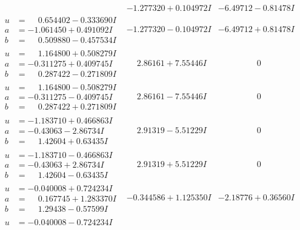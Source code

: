 \documentclass[1p]{elsarticle_modified}
\theoremstyle{definition}
\begin{document}
$$\begin{array}{c|c|c}
 & -1.277320 + 0.104972 I & -6.49712 - 0.81478 I \\ \hline\begin{aligned}
u &= \phantom{-}0.654402 - 0.333690 I \\
a &= -1.061450 + 0.491092 I \\
b &= \phantom{-}0.509880 - 0.457534 I\end{aligned}
 & -1.277320 - 0.104972 I & -6.49712 + 0.81478 I \\ \hline\begin{aligned}
u &= \phantom{-}1.164800 + 0.508279 I \\
a &= -0.311275 + 0.409745 I \\
b &= \phantom{-}0.287422 - 0.271809 I\end{aligned}
 & \phantom{-}2.86161 + 7.55446 I & \phantom{-0.000000 } 0 \\ \hline\begin{aligned}
u &= \phantom{-}1.164800 - 0.508279 I \\
a &= -0.311275 - 0.409745 I \\
b &= \phantom{-}0.287422 + 0.271809 I\end{aligned}
 & \phantom{-}2.86161 - 7.55446 I & \phantom{-0.000000 } 0 \\ \hline\begin{aligned}
u &= -1.183710 + 0.466863 I \\
a &= -0.43063 - 2.86734 I \\
b &= \phantom{-}1.42604 + 0.63435 I\end{aligned}
 & \phantom{-}2.91319 - 5.51229 I & \phantom{-0.000000 } 0 \\ \hline\begin{aligned}
u &= -1.183710 - 0.466863 I \\
a &= -0.43063 + 2.86734 I \\
b &= \phantom{-}1.42604 - 0.63435 I\end{aligned}
 & \phantom{-}2.91319 + 5.51229 I & \phantom{-0.000000 } 0 \\ \hline\begin{aligned}
u &= -0.040008 + 0.724234 I \\
a &= \phantom{-}0.167745 + 1.283370 I \\
b &= \phantom{-}1.29438 - 0.57599 I\end{aligned}
 & -0.344586 + 1.125350 I & -2.18776 + 0.36560 I \\ \hline\begin{aligned}
u &= -0.040008 - 0.724234 I \\

\end{aligned}
\end{array}$$
\end{document}
